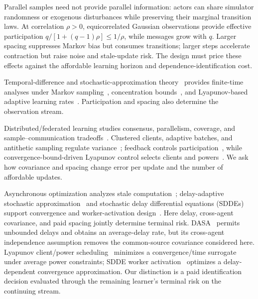 \documentclass[journal]{IEEEtran}
\begin{document}
Parallel samples need not provide parallel information: actors can share simulator randomness or exogenous disturbances while preserving their marginal transition laws.
At correlation $\rho>0$, equicorrelated Gaussian observations provide effective participation $q/[1+(q-1)\rho]\le1/\rho$, while messages grow with $q$.
Larger spacing suppresses Markov bias but consumes transitions; larger steps accelerate contraction but raise noise and stale-update risk.
The design must price these effects against the affordable learning horizon and dependence-identification cost.

Temporal-difference and stochastic-approximation theory~\cite{sutton1988td,tsitsiklis1997td,robbins1951stochastic,polyak1992averaging} provides finite-time analyses under Markov sampling~\cite{bhandari2018finite,srikant2019finite,mou2022optimal}, concentration bounds~\cite{paulin2015concentration}, and Lyapunov-based adaptive learning rates~\cite{gupta2019adaptive}.
Participation and spacing also determine the observation stream.

Distributed/federated learning studies consensus, parallelism, coverage, and sample--communication tradeoffs~\cite{doan2019distributed,zhang2018decentralized,khodadadian2022federated,woo2023heterogeneity,salgia2024tradeoff,lan2023communication}.
Clustered clients, adaptive batches, and antithetic sampling regulate variance~\cite{fraboni2021clustered,de2017adaptive,ren2019antithetic}; feedback controls participation~\cite{cummins2025feedback}, while convergence-bound-driven Lyapunov control selects clients and powers~\cite{perazzone2025lyapunov}.
We ask how covariance and spacing change error per update and the number of affordable updates.

Asynchronous optimization analyzes stale computation~\cite{agarwal2011distributed,lian2015asynchronous,arjevani2020delayed}; delay-adaptive stochastic approximation~\cite{adibi2024delayed,dalfabbro2024dasa} and stochastic delay differential equations (SDDEs) support convergence and worker-activation design~\cite{yu2025sdde}.
Here delay, cross-agent covariance, and paid spacing jointly determine terminal risk.
DASA~\cite{dalfabbro2024dasa} permits unbounded delays and obtains an average-delay rate, but its cross-agent independence assumption removes the common-source covariance considered here.
Lyapunov client/power scheduling~\cite{perazzone2025lyapunov} minimizes a convergence/time surrogate under average power constraints; SDDE worker activation~\cite{yu2025sdde} optimizes a delay-dependent convergence approximation.
Our distinction is a paid identification decision evaluated through the remaining learner's terminal risk on the continuing stream.
\end{document}
